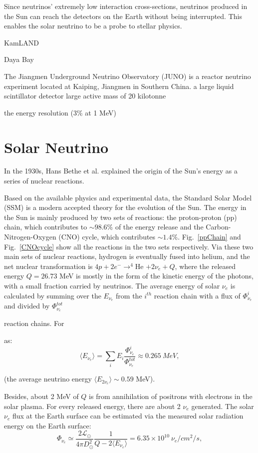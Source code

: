 Since neutrinos' extremely low interaction cross-sections, neutrinos produced in the Sun can reach the detectors on the Earth without being interrupted. This enables the solar neutrino to be a probe to stellar physics.

KamLAND

Daya Bay

The Jiangmen Underground Neutrino Observatory (JUNO) is a reactor neutrino experiment located at Kaiping, Jiangmen in Southern China. a large liquid scintillator detector 
large active mass of 20 kilotonne

the energy resolution (3\% at 1 MeV) 
\cite{giaz2018status}

\section{Solar Neutrino}
In the 1930s, Hans Bethe et al. explained the origin of the Sun's energy as a series of nuclear reactions\cite{bethe1939energy}.

Based on the available physics and experimental data, the Standard Solar Model (SSM) is a modern accepted theory for the evolution of the Sun. The energy in the Sun is mainly produced by two sets of reactions: the proton-proton (pp) chain, which contributes to $\sim 98.6\%$ of the energy release and the Carbon-Nitrogen-Oxygen (CNO) cycle, which contributes $\sim 1.4\%$. Fig.~\ref{ppChain} and Fig.~\ref{CNOcycle} show all the reactions in the two sets respectively. Via these two main sets of nuclear reactions, hydrogen is eventually fused into helium, and the net nuclear transformation is $4p+2e^-\to^{4}$He $+2\nu_e+Q$, where the released energy $Q=26.73$ MeV is mostly in the form of the kinetic energy of the photons, with a small fraction carried by neutrinos\cite{valle2015neutrinos,antonio2018state}. The average energy of solar $\nu_e$ is calculated by summing over the $E_{\nu_e}$ from the $i^{th}$ reaction chain with a flux of $\Phi_{\nu_e}^i$ and 
divided by $\Phi^{tot}_{\nu_e}$

reaction chains. For 


 as\cite{antonio2018state}:
\begin{equation}
\langle E_{\nu_e}\rangle = \sum_i E_i \frac{\Phi^i_{\nu_e}}{\Phi^{tot}_{\nu_e}}\approx 0.265~MeV,
\end{equation}


(the average neutrino energy $\langle E_{2\nu_e} \rangle\sim 0.59$ MeV). 
 
 
 Besides, about 2 MeV of $Q$ is from annihilation of positrons with electrons in the solar plasma\cite{valle2015neutrinos,antonio2018state}. For every released energy, there are about 2 $\nu_e$ generated. The solar $\nu_e$ flux at the Earth surface can be estimated via the measured solar radiation energy on the Earth surface:
\begin{equation}
\Phi_{\nu_e} \simeq \frac{2\mathcal{L}_{\odot}}{4\pi D_\odot^2}\frac{1}{Q-2\langle E_{\nu_e} \rangle}= 6.35\times 10^{10}~\nu_e/cm^2/s,
\end{equation}

